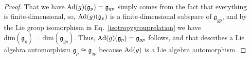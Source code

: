 \begin{proof}
That we have $\mathrm{Ad}\mleft(g\mright)(\mathfrak{g}_p) = \mathfrak{g}_{gp}$ simply comes from the fact that everything is finite-dimensional, so, $\mathrm{Ad}\mleft(g\mright)(\mathfrak{g}_p)$ is a finite-dimensional subspace of $\mathfrak{g}_{gp}$, and by the Lie group isomorphism in Eq.~\eqref{isotropygrouprelation} we have $\mathrm{dim}(\mathfrak{g}_p) = \mathrm{dim}(\mathfrak{g}_{gp})$. Thus, $\mathrm{Ad}\mleft(g\mright)(\mathfrak{g}_p) = \mathfrak{g}_{gp}$ follows, and that describes a Lie algebra automorphism $\mathfrak{g}_p \cong \mathfrak{g}_{gp}$ because $\mathrm{Ad}\mleft(g\mright)$ is a Lie algebra automorphism.
%
\end{proof}

